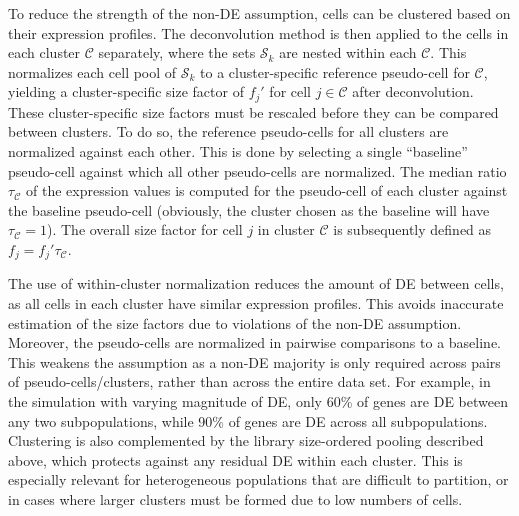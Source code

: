 \documentclass{bmcart}
\begin{document}
To reduce the strength of the non-DE assumption, cells can be clustered based on their expression profiles.
The deconvolution method is then applied to the cells in each cluster $\mathcal{C}$ separately,
    where the sets $\mathcal{S}_k$ are nested within each $\mathcal{C}$.
This normalizes each cell pool of $\mathcal{S}_k$ to a cluster-specific reference pseudo-cell for $\mathcal{C}$,
    yielding a cluster-specific size factor of $f_{j}'$ for cell $j \in \mathcal{C}$ after deconvolution.
These cluster-specific size factors must be rescaled before they can be compared between clusters.
To do so, the reference pseudo-cells for all clusters are normalized against each other.
This is done by selecting a single ``baseline'' pseudo-cell against which all other pseudo-cells are normalized.
The median ratio $\tau_{\mathcal{C}}$ of the expression values is computed for the pseudo-cell of each cluster against the baseline pseudo-cell
    (obviously, the cluster chosen as the baseline will have $\tau_{\mathcal{C}}=1$).
The overall size factor for cell $j$ in cluster $\mathcal{C}$ is subsequently defined as $f_j = f_{j}'\tau_{\mathcal{C}}$.


The use of within-cluster normalization reduces the amount of DE between cells, as all cells in each cluster have similar expression profiles.
This avoids inaccurate estimation of the size factors due to violations of the non-DE assumption.
Moreover, the pseudo-cells are normalized in pairwise comparisons to a baseline.
This weakens the assumption as a non-DE majority is only required across pairs of pseudo-cells/clusters, rather than across the entire data set.
For example, in the simulation with varying magnitude of DE, only 60\% of genes are DE between any two subpopulations, while 90\% of genes are DE across all subpopulations.
Clustering is also complemented by the library size-ordered pooling described above, which protects against any residual DE within each cluster.
This is especially relevant for heterogeneous populations that are difficult to partition, or in cases where larger clusters must be formed due to low numbers of cells.
\end{document}
